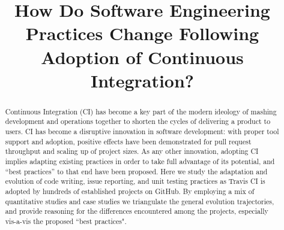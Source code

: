 \documentclass[conference]{IEEEtran}
\newcommand{\GH}{{\sc GitHub}\xspace}
\newcommand{\Tvis}{{\sc Travis CI}\xspace}
\begin{document}
\title{How Do Software Engineering Practices
Change Following Adoption of Continuous Integration?}

\author
{
\and
{}
\and
{}
\and
{}
\and
{}
}
\maketitle
\begin{abstract}
Continuous Integration (CI) has become a key part of the modern ideology 
of mashing development and operations together to shorten the cycles of 
delivering a product to users. 
CI has become a disruptive innovation in software development: with proper 
tool support and adoption, positive effects have been demonstrated for pull 
request throughput and scaling up of project sizes. 
As any other innovation, adopting CI implies adapting existing practices in 
order to take full advantage of its potential, and ``best practices'' to that end 
have been proposed. 
Here we study the adaptation and evolution of code writing, issue reporting, 
and unit testing practices as \Tvis is adopted by hundreds of established 
projects on \GH. 
By employing a mix of quantitative studies and case studies we triangulate 
the general evolution trajectories, and provide reasoning for the differences 
encountered among the projects, especially vis-a-vis the proposed ``best 
practices".
\end{abstract}















\balance



\end{document}

